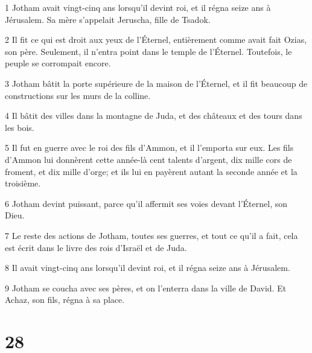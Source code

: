 \par 1 Jotham avait vingt-cinq ans lorsqu'il devint roi, et il régna seize ans à Jérusalem. Sa mère s'appelait Jeruscha, fille de Tsadok.
\par 2 Il fit ce qui est droit aux yeux de l'Éternel, entièrement comme avait fait Ozias, son père. Seulement, il n'entra point dans le temple de l'Éternel. Toutefois, le peuple se corrompait encore.
\par 3 Jotham bâtit la porte supérieure de la maison de l'Éternel, et il fit beaucoup de constructions sur les murs de la colline.
\par 4 Il bâtit des villes dans la montagne de Juda, et des châteaux et des tours dans les bois.
\par 5 Il fut en guerre avec le roi des fils d'Ammon, et il l'emporta sur eux. Les fils d'Ammon lui donnèrent cette année-là cent talents d'argent, dix mille cors de froment, et dix mille d'orge; et ils lui en payèrent autant la seconde année et la troisième.
\par 6 Jotham devint puissant, parce qu'il affermit ses voies devant l'Éternel, son Dieu.
\par 7 Le reste des actions de Jotham, toutes ses guerres, et tout ce qu'il a fait, cela est écrit dans le livre des rois d'Israël et de Juda.
\par 8 Il avait vingt-cinq ans lorsqu'il devint roi, et il régna seize ans à Jérusalem.
\par 9 Jotham se coucha avec ses pères, et on l'enterra dans la ville de David. Et Achaz, son fils, régna à sa place.

\chapter{28}

